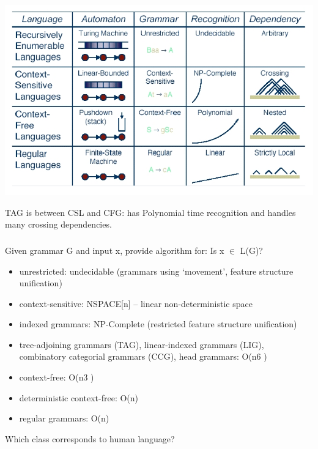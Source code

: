 \documentclass[compress,color=usenames]{beamer}
\begin{document}
\begin{frame}
\frametitle{}

\begin{center}
\includegraphics[scale=.4]{pics/pic2-7.jpg}
\end{center}


TAG is between CSL and CFG: has Polynomial time recognition and handles many crossing dependencies.

\end{frame}

\begin{frame}
\frametitle{}


Given grammar G and input x, provide algorithm for: Is x $\in$ L(G)?


\begin{itemize}
\item unrestricted: undecidable (grammars using {`}movement', feature structure unification)


\item context-sensitive: NSPACE[n] -- linear non-deterministic space


\item indexed grammars: NP-Complete (restricted feature structure unification)


\item tree-adjoining grammars (TAG), linear-indexed grammars (LIG), combinatory
categorial grammars (CCG), head grammars: O(n6 )


\item context-free: O(n3 )


\item deterministic context-free: O(n)


\item regular grammars: O(n)

\end{itemize}


Which class corresponds to human language?

\end{frame}
\end{document}
